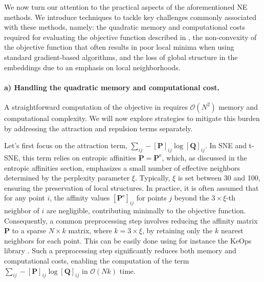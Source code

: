 We now turn our attention to the practical aspects of the aforementioned NE methods. We introduce techniques to tackle key challenges commonly associated with these methods, namely: the quadratic memory and computational costs required for evaluating the objective function described in , the non-convexity of the objective function that often results in poor local minima when using standard gradient-based algorithms, and the loss of global structure in the embeddings due to an emphasis on local neighborhoods.

\paragraph{a) Handling the quadratic memory and computational cost.}
A straightforward computation of the objective in  requires $\mathcal{O}(N^2)$ memory and computational complexity. We will now explore strategies to mitigate this burden by addressing the attraction and repulsion terms separately.

Let's first focus on the attraction term, \(\sum_{ij} -[\mathbf{P}]_{ij} \log [\mathbf{Q}]_{ij}\). In SNE and t-SNE, this term relies on entropic affinities \ie \(\mathbf{P} = \mathbf{P}^{\mathrm{e}}\), which, as discussed in the entropic affinities section, emphasizes a small number of effective neighbors determined by the perplexity parameter \(\xi\). Typically, \(\xi\) is set between 30 and 100, ensuring the preservation of local structures. In practice, it is often assumed that for any point \(i\), the affinity values \([\mathbf{P}^{\mathrm{e}}]_{ij}\) for points \(j\) beyond the \(3 \times \xi\)-th neighbor of \(i\) are negligible, contributing minimally to the objective function. Consequently, a common preprocessing step involves reducing the affinity matrix \(\mathbf{P}\) to a sparse \(N \times k\) matrix, where \(k = 3 \times \xi\), by retaining only the \(k\) nearest neighbors for each point. This can be easily done using for instance the KeOps library \citep{charlier2021kernel}. Such a preprocessing step significantly reduces both memory and computational costs, enabling the computation of the term \(\sum_{ij} -[\mathbf{P}]_{ij} \log [\mathbf{Q}]_{ij}\) in \(\mathcal{O}(Nk)\) time.


